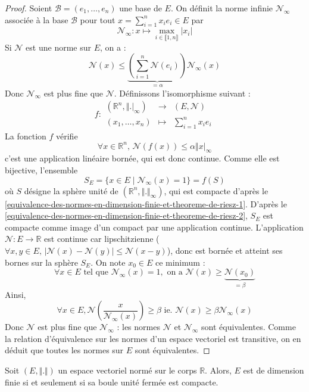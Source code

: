   \begin{proof}
    Soient $\mathcal{B} = (e_1, \dots, e_n)$ une base de $E$. On définit la norme infinie $\mathcal{N}_\infty$ associée à la base $\mathcal{B}$ pour tout $x = \sum_{i=1}^n x_i e_i \in E$ par
    \[ \mathcal{N}_\infty : x \mapsto \max_{i \in \llbracket 1, n \rrbracket} \vert x_i \vert \]
    Si $\mathcal{N}$ est une norme sur $E$, on a :
    \[ \mathcal{N}(x) \leq \underbrace{\left( \sum_{i=1}^n \mathcal{N}(e_i) \right)}_{= \alpha} \mathcal{N}_\infty(x) \]
    Donc $\mathcal{N}_\infty$ est plus fine que $\mathcal{N}$.
    \newpar
    Définissons l'isomorphisme suivant :
    \[
      f :
      \begin{array}{ccc}
        (\mathbb{R}^n, \Vert . \vert_\infty) &\rightarrow& (E, \mathcal{N}) \\
        (x_1, \dots, x_n) &\mapsto& \sum_{i=1}^n x_i e_i
      \end{array}
    \]
    La fonction $f$ vérifie
    \[ \forall x \in \mathbb{R}^n, \, \mathcal{N}(f(x)) \leq \alpha \Vert x \vert_\infty \]
    c'est une application linéaire bornée, qui est donc continue. Comme elle est bijective, l'ensemble
    \[ S_E = \{ x \in E \mid \mathcal{N}_\infty(x) = 1 \} = f(S) \]
    où $S$ désigne la sphère unité de $(\mathbb{R}^n, \Vert. \Vert_\infty)$, qui est compacte d'après le \cref{equivalence-des-normes-en-dimension-finie-et-theoreme-de-riesz-1}. D'après le \cref{equivalence-des-normes-en-dimension-finie-et-theoreme-de-riesz-2}, $S_E$ est compacte comme image d'un compact par une application continue.  L'application $\mathcal{N} : E \rightarrow \mathbb{R}$ est continue car lipschitzienne ($\forall x, y \in E, \, \vert \mathcal{N}(x) - \mathcal{N}(y) \vert \leq \mathcal{N}(x - y)$), donc est bornée et atteint ses bornes sur la sphère $S_E$. On note $x_0 \in E$ ce minimum :
    \[ \forall x \in E \text{ tel que } \mathcal{N}_\infty(x) = 1, \text{ on a } \mathcal{N}(x) \geq \underbrace{\mathcal{N}(x_0)}_{= \beta} \]
    Ainsi,
    \[ \forall x \in E, \mathcal{N} \left(\frac{x}{\mathcal{N}_\infty(x)} \right) \geq \beta \text{ ie. } \mathcal{N}(x) \geq \beta \mathcal{N}_\infty(x) \]
    Donc $\mathcal{N}$ est plus fine que $\mathcal{N}_\infty$ : les normes $\mathcal{N}$ et $\mathcal{N}_\infty$ sont équivalentes. Comme la relation d'équivalence sur les normes d'un espace vectoriel est transitive, on en déduit que toutes les normes sur $E$ sont équivalentes.
  \end{proof}

  \begin{theorem}[Riesz]
    Soit $(E, \Vert . \Vert)$ un espace vectoriel normé sur le corps $\mathbb{R}$. Alors, $E$ est de dimension finie si et seulement si sa boule unité fermée est compacte.
  \end{theorem}

